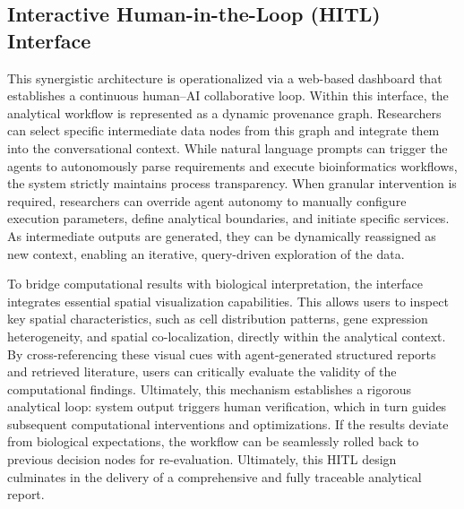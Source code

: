 \documentclass[a4,center,fleqn]{NAR}
\begin{document}
\subsection{Interactive Human-in-the-Loop (HITL) Interface}

This synergistic architecture is operationalized via a web-based dashboard that establishes a continuous human--AI collaborative loop. Within this interface, the analytical workflow is represented as a dynamic provenance graph. Researchers can select specific intermediate data nodes from this graph and integrate them into the conversational context. While natural language prompts can trigger the agents to autonomously parse requirements and execute bioinformatics workflows, the system strictly maintains process transparency. When granular intervention is required, researchers can override agent autonomy to manually configure execution parameters, define analytical boundaries, and initiate specific services. As intermediate outputs are generated, they can be dynamically reassigned as new context, enabling an iterative, query-driven exploration of the data. 

To bridge computational results with biological interpretation, the interface integrates essential spatial visualization capabilities. This allows users to inspect key spatial characteristics, such as cell distribution patterns, gene expression heterogeneity, and spatial co-localization, directly within the analytical context. By cross-referencing these visual cues with agent-generated structured reports and retrieved literature, users can critically evaluate the validity of the computational findings. Ultimately, this mechanism establishes a rigorous analytical loop: system output triggers human verification, which in turn guides subsequent computational interventions and optimizations. If the results deviate from biological expectations, the workflow can be seamlessly rolled back to previous decision nodes for re-evaluation. Ultimately, this HITL design culminates in the delivery of a comprehensive and fully traceable analytical report.
\end{document}
